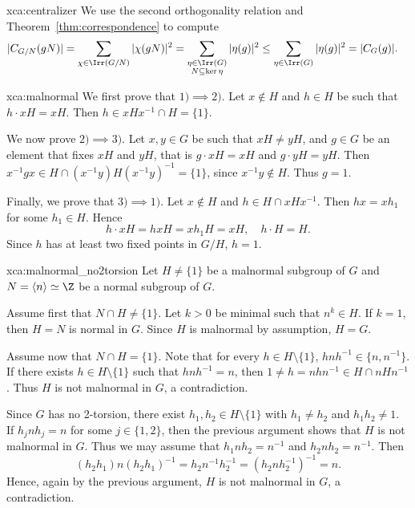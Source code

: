 \begin{sol}{xca:centralizer}
    We use the second orthogonality relation and Theorem~\ref{thm:correspondence} 
    to compute
    \begin{align*}
        |C_{G/N}(gN)| &=\sum_{\chi\in\Irr(G/N)}|\chi(gN)|^2
        =\sum_{\substack{\eta\in\Irr(G)\\N\subseteq\ker\eta}} |\eta(g)|^2
        \leq\sum_{\eta\in\Irr(G)}|\eta(g)|^2=|C_G(g)|.
    \end{align*}
\end{sol}

\begin{sol}{xca:malnormal}
    We first prove that $1)\implies2)$. Let $x\not\in H$ and 
    $h\in H$ be such that $h\cdot xH=xH$. Then 
    $h\in xHx^{-1}\cap H=\{1\}$. 

    We now prove $2)\implies3)$. Let $x,y\in G$ be such that 
    $xH\ne yH$, and $g\in G$ be an element 
    that fixes $xH$ and $yH$, that is 
    $g\cdot xH=xH$ and $g\cdot yH=yH$. Then 
    $x^{-1}gx\in H\cap (x^{-1}y)H(x^{-1}y)^{-1}=\{1\}$,
    since $x^{-1}y\not\in H$. Thus $g=1$. 

    Finally, we prove that $3)\implies1)$. Let $x\not\in H$ and $h\in H\cap xHx^{-1}$. Then 
    $hx=xh_1$ for some $h_1\in H$. Hence
    \[
    h\cdot xH=hxH=xh_1H=xH,\quad 
    h\cdot H=H.
    \]
    Since $h$ has at least two fixed points
    in $G/H$, $h=1$. 
\end{sol}

\begin{sol}{xca:malnormal_no2torsion}
    Let $H\ne\{1\}$ be a malnormal subgroup of $G$ and $N=\langle n\rangle\simeq\Z$ be a
    normal subgroup of $G$. 

    Assume first that $N\cap H\ne\{1\}$. Let $k>0$ be minimal such that $n^k\in H$. If $k=1$, then
    $H=N$ is normal in $G$. Since $H$ is malnormal by assumption, $H=G$. 
    
    Assume now that $N\cap H=\{1\}$. Note that
    for every $h\in H\setminus\{1\}$, 
    $hnh^{-1}\in\{n,n^{-1}\}$. 
    If there exists 
    $h\in H\setminus\{1\}$ such that $hnh^{-1}=n$, then
    $1\ne h=nhn^{-1}\in H\cap nHn^{-1}$. Thus $H$ is not malnormal in $G$, a contradiction. 

    Since $G$ has no 2-torsion, there exist 
    $h_1,h_2\in H\setminus\{1\}$ with $h_1\ne h_2$ and 
    $h_1h_2\ne 1$. If $h_jnh_j=n$ for some $j\in\{1,2\}$, 
    then the previous argument shows that 
    $H$ is not malnormal in $G$. Thus we may assume that  $h_1nh_2=n^{-1}$ and 
    $h_2nh_2=n^{-1}$. Then 
    \[
    (h_2h_1)n(h_2h_1)^{-1}=h_2n^{-1}h_2^{-1}
    =(h_2nh_2^{-1})^{-1}=n.
    \]
    Hence, again by the previous argument, 
    $H$ is not malnormal in $G$, a contradiction.  
\end{sol}